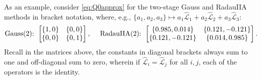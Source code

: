 \documentclass[review]{siamart}
\begin{document}
As an example, consider \eqref{eq:Q0approx} for the two-stage Gauss and
RadauIIA methods in bracket notation, where, e.g., $\{a_1,a_2,a_3\}\mapsto
a_1\widehat{\mathcal{L}}_1 + a_2\widehat{\mathcal{L}}_2 + a_3\widehat{\mathcal{L}}_3$:
%
\begin{align*}
\textnormal{Gauss(2):} \hspace{1ex}
	\begin{bmatrix}
	\{1,0\} & \{0,0\} \\
	 \{0,0\} & \{0,1\} \\
	\end{bmatrix},
	\hspace{3ex}
\textnormal{RadauIIA(2):} \hspace{1ex}
	\begin{bmatrix}
	\{0.985,0.014\} & \{0.121,-0.121\}\\
	\{0.121,-0.121\} & \{0.014,0.985\}\\
	\end{bmatrix}.
\end{align*}
%
Recall in the matrices above, the constants in diagonal brackets always sum to
one and off-diagonal sum to zero, wherein if $\widehat{\mathcal{L}}_i = \widehat{\mathcal{L}}_j$
for all $i,j$, each of the operators is the identity.
\end{document}
